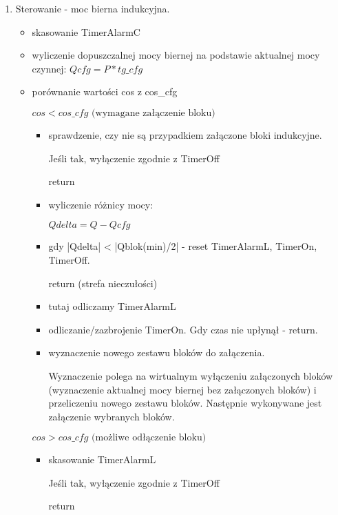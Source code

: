 \documentclass[12pt,a4paper]{article}
\begin{document}
\begin{enumerate}
	\item Sterowanie - moc bierna indukcyjna.

	\begin{itemize}
		\vspace{-2mm}
		\setlength\itemsep{0mm}
		\item skasowanie TimerAlarmC
		\item wyliczenie dopuszczalnej mocy biernej na podstawie aktualnej mocy czynnej:
		$Qcfg = P * tg\_cfg$
		\item porównanie wartości cos z cos\_cfg
		
		$cos < cos\_cfg \text{  (wymagane załączenie bloku)}$
		
		\begin{itemize}
		\vspace{-2mm}
		\setlength\itemsep{0mm}
		\item sprawdzenie, czy nie są przypadkiem załączone bloki indukcyjne.
		
		Jeśli tak, wyłączenie zgodnie z TimerOff
		
		return

		\item wyliczenie różnicy mocy:
		
		$Qdelta = Q - Qcfg$
		\item gdy |Qdelta| < |Qblok(min)/2| - reset TimerAlarmL, TimerOn, TimerOff.
		
		return (strefa nieczułości)
		\item tutaj odliczamy TimerAlarmL
		\item odliczanie/zazbrojenie TimerOn. Gdy czas nie upłynął - return.
		\item wyznaczenie nowego zestawu bloków do załączenia.
		
		Wyznaczenie polega na wirtualnym wyłączeniu załączonych bloków
		(wyznaczenie aktualnej mocy biernej bez załączonych bloków) i przeliczeniu nowego zestawu bloków.
		Następnie wykonywane jest załączenie wybranych bloków.
		\end{itemize}

		$cos > cos\_cfg \text{  (możliwe odłączenie bloku)}$

		\begin{itemize}
			\vspace{-2mm}
			\setlength\itemsep{0mm}
			\item skasowanie TimerAlarmL
			
			Jeśli tak, wyłączenie zgodnie z TimerOff
			
			return
			

\end{itemize}
\end{itemize}
\end{enumerate}
\end{document}
